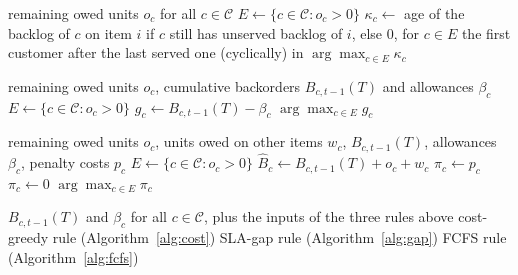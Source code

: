 \documentclass[11pt, a4paper]{article}
\theoremstyle{definition}
\theoremstyle{remark}
\begin{document}
\begin{algorithm}[H]
\caption{FCFS rule}
\label{alg:fcfs}
\begin{algorithmic}[1]
\Require remaining owed units $o_c$ for all $c \in \mathcal{C}$
\State $E \gets \{c \in \mathcal{C} : o_c > 0\}$
\State $\kappa_c \gets$ age of the backlog of $c$ on item $i$ if $c$ still has unserved backlog of $i$, else $0$, for $c \in E$
\State \Return the first customer after the last served one (cyclically) in $\arg\max_{c \in E} \kappa_c$
\end{algorithmic}
\end{algorithm}

\begin{algorithm}[H]
\caption{SLA-gap rule}
\label{alg:gap}
\begin{algorithmic}[1]
\Require remaining owed units $o_c$, cumulative backorders $B_{c,t-1}(T)$ and allowances $\beta_c$
\State $E \gets \{c \in \mathcal{C} : o_c > 0\}$
    \State $g_c \gets B_{c,t-1}(T) - \beta_c$ 
\EndFor
\State \Return $\arg\max_{c \in E} g_c$ 
\end{algorithmic}
\end{algorithm}

\begin{algorithm}[H]
\caption{Cost-greedy rule}
\label{alg:cost}
\begin{algorithmic}[1]
\Require remaining owed units $o_c$, units owed on other items $w_c$, $B_{c,t-1}(T)$, allowances $\beta_c$, penalty costs $p_c$
\State $E \gets \{c \in \mathcal{C} : o_c > 0\}$
    \State $\widehat{B}_c \gets B_{c,t-1}(T) + o_c + w_c$ 
        \State $\pi_c \gets p_c$ 
    \Else
        \State $\pi_c \gets 0$
    \EndIf
\EndFor
\State \Return $\arg\max_{c \in E} \pi_c$ 
\end{algorithmic}
\end{algorithm}

\begin{algorithm}[H]
\caption{Greedy-dynamic rule}
\label{alg:dynamic}
\begin{algorithmic}[1]
\Require $B_{c,t-1}(T)$ and $\beta_c$ for all $c \in \mathcal{C}$, plus the inputs of the three rules above
    \State \Return cost-greedy rule (Algorithm~\ref{alg:cost})
    \State \Return SLA-gap rule (Algorithm~\ref{alg:gap})
\Else
    \State \Return FCFS rule (Algorithm~\ref{alg:fcfs})
\EndIf
\end{algorithmic}
\end{algorithm}
\end{document}
